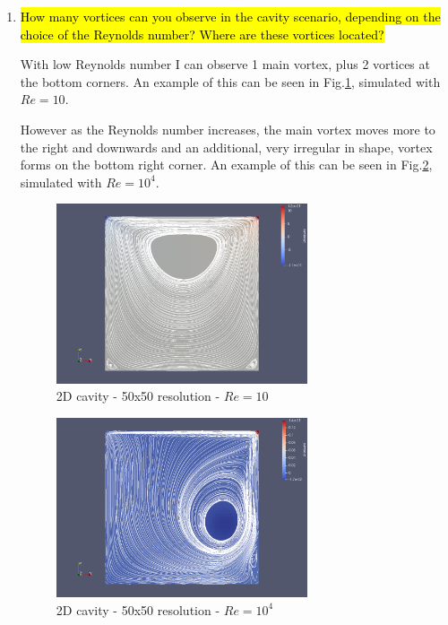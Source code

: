 \documentclass[11pt,a4paper,DIV12,pdftex]{scrartcl}
\begin{document}
\begin{enumerate}
	\item \hl{How many vortices can you observe in the cavity scenario, depending on the choice of the Reynolds number? Where are these vortices located?}

	With low Reynolds number I can observe 1 main vortex, plus 2 vortices at the bottom corners. An example of this can be seen in Fig.\ref{fig:cavity2D_50x50_Re10}, simulated with $Re = 10$.

	However as the Reynolds number increases, the main vortex moves more to the right and downwards and an additional, very irregular in shape, vortex forms on the bottom right corner. An example of this can be seen in Fig.\ref{fig:cavity2D_50x50_Re10000}, simulated with $Re = 10^4$.

	\begin{figure}[h!]
		\centering
		\includegraphics[width=0.7\textwidth]{Figures/cavity2D_50x50_Re10.png}
		\caption{2D cavity - 50x50 resolution - $Re = 10$} 
		\label{fig:cavity2D_50x50_Re10}
	\end{figure}

	\begin{figure}[h!]
		\centering
		\includegraphics[width=0.7\textwidth]{Figures/cavity2D_50x50_Re10000.png}
		\caption{2D cavity - 50x50 resolution - $Re = 10^4$} 
		\label{fig:cavity2D_50x50_Re10000}
	\end{figure}


\end{enumerate}
\end{document}
